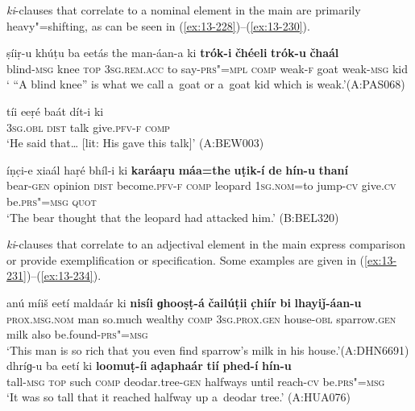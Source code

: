  \textit{ki}-clauses that correlate to a nominal element in the main  are primarily heavy"=shifting, as can be seen in (\ref{ex:13-228})--(\ref{ex:13-230}).

\begin{exe}
\ex
\label{ex:13-228}
\gll ṣíiṛ-u khúṭu ba eetás the  man-áan-a ki \textbf{trók-i} \textbf{čhéeli} \textbf{trók-u} \textbf{čhaál} \\
blind-\textsc{msg} knee \textsc{top} \textsc{3sg.rem.acc} to say-\textsc{prs"=mpl} \textsc{comp} weak-\textsc{f} goat weak-\textsc{msg} kid \\
\glt ` ``A blind knee'' is what we call a~goat or a~goat kid which is weak.'\newline (A:PAS068)

\ex
\label{ex:13-229}
\gll tíi eeṛé baát dít-i ki  \\
\textsc{3sg.obl} \textsc{dist} talk give.\textsc{pfv-f} \textsc{comp}  \\
\glt `He said that{\ldots} [lit: His gave this talk]' (A:BEW003)

\ex
\label{ex:13-230}
\gll íṇc̣i-e xiaál haṛé bhíl-i  ki \textbf{karáaṛu} \textbf{máa=the} \textbf{uṭik-í} \textbf{de} \textbf{hín-u} \textbf{thaní} \\
bear-\textsc{gen} opinion \textsc{dist} become.\textsc{pfv-f} \textsc{comp} leopard \textsc{1sg.nom=}to jump-\textsc{cv} give.\textsc{cv} be.\textsc{prs"=msg} \textsc{quot} \\
\glt `The bear thought that the leopard had attacked him.' (B:BEL320) 
\end{exe}

 \textit{ki}-clauses that correlate to an adjectival element in the main  express comparison or provide exemplification or specification. Some examples are given in (\ref{ex:13-231})--(\ref{ex:13-234}).

\ea
\label{ex:13-231}
\gll anú míiš eetí maldaár ki \textbf{nisíi} \textbf{ɡhooṣṭ-á} \textbf{čailúṭii} \textbf{c̣hiír} \textbf{bi} \textbf{lhayiǰ-áan-u}\\
\textsc{prox.msg.nom} man so.much wealthy \textsc{comp} \textsc{3sg.prox.gen }  house-\textsc{obl} sparrow.\textsc{gen} milk also be.found-\textsc{prs"=msg}\\
\glt `This man is so rich that you even find sparrow's milk in his house.'\newline (A:DHN6691)
\ex
\label{ex:13-232}
\gll dhríɡ-u ba eetí ki \textbf{loomuṭ-íi} \textbf{aḍaphaár} \textbf{tií} \textbf{phed-í} \textbf{hín-u}\\
tall-\textsc{msg} \textsc{top} such \textsc{comp} deodar.tree-\textsc{gen} halfways until reach-\textsc{cv} be.\textsc{prs"=msg}\\
\glt `It was so tall that it reached halfway up a~deodar tree.' (A:HUA076)

